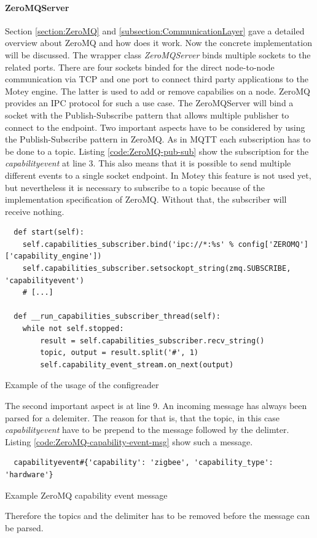 \paragraph{ZeroMQServer}
Section \ref{section:ZeroMQ} and \ref{subsection:CommunicationLayer} gave a detailed overview about ZeroMQ and how does it work.
Now the concrete implementation will be discussed.
The wrapper class \textit{ZeroMQServer} binds multiple sockets to the related ports.
There are four sockets binded for the direct node-to-node communication via \ac{TCP} and one port to connect third party applications to the Motey engine.
The latter is used to add or remove capabilies on a node.
ZeroMQ provides an \ac{IPC} protocol for such a use case.
The ZeroMQServer will bind a socket with the Publish-Subscribe pattern that allows multiple publisher to connect to the endpoint.
Two important aspects have to be considered by using the Publish-Subscribe pattern in ZeroMQ.
As in \ac{MQTT} each subscription has to be done to a topic.
Listing \ref{code:ZeroMQ-pub-sub} show the subscription for the \textit{capabilityevent} at line 3.
This also means that it is possible to send multiple different events to a single socket endpoint.
In Motey this feature is not used yet, but nevertheless it is necessary to subscribe to a topic because of the implementation specification of ZeroMQ.
Without that, the subscriber will receive nothing.

\begin{listing}[H]
  \begin{verbatim}
  def start(self):
    self.capabilities_subscriber.bind('ipc://*:%s' % config['ZEROMQ']['capability_engine'])
    self.capabilities_subscriber.setsockopt_string(zmq.SUBSCRIBE, 'capabilityevent')
    # [...]

  def __run_capabilities_subscriber_thread(self):
    while not self.stopped:
        result = self.capabilities_subscriber.recv_string()
        topic, output = result.split('#', 1)
        self.capability_event_stream.on_next(output)
  \end{verbatim}
  \caption{Example of the usage of the configreader}
  \label{code:ZeroMQ-pub-sub}
\end{listing}

The second important aspect is at line 9.
An incoming message has always been parsed for a delemiter.
The reason for that is, that the topic, in this case \textit{capabilityevent} have to be prepend to the message followed by the delimter.
Listing \ref{code:ZeroMQ-capability-event-msg} show such a message.
\begin{listing}[H]
  \begin{verbatim}
  capabilityevent#{'capability': 'zigbee', 'capability_type': 'hardware'}
  \end{verbatim}
  \caption{Example ZeroMQ capability event message}
  \label{code:ZeroMQ-capability-event-msg}
\end{listing}
Therefore the topics and the delimiter has to be removed before the message can be parsed.

